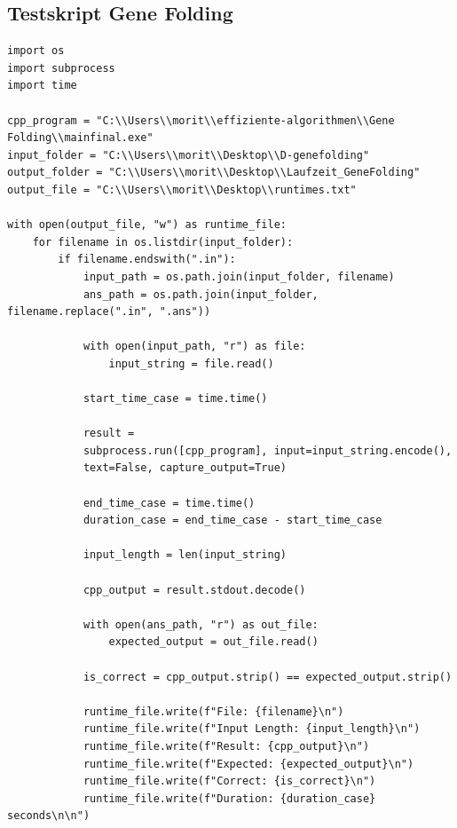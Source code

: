 \subsection{Testskript Gene Folding}
\label{subsec:TextBefehle}
\begin{verbatim}
import os
import subprocess
import time

cpp_program = "C:\\Users\\morit\\effiziente-algorithmen\\Gene Folding\\mainfinal.exe"
input_folder = "C:\\Users\\morit\\Desktop\\D-genefolding"
output_folder = "C:\\Users\\morit\\Desktop\\Laufzeit_GeneFolding"
output_file = "C:\\Users\\morit\\Desktop\\runtimes.txt"

with open(output_file, "w") as runtime_file:
    for filename in os.listdir(input_folder):
        if filename.endswith(".in"):
            input_path = os.path.join(input_folder, filename)
            ans_path = os.path.join(input_folder, filename.replace(".in", ".ans"))

            with open(input_path, "r") as file:
                input_string = file.read()

            start_time_case = time.time()

            result = 
            subprocess.run([cpp_program], input=input_string.encode(), 
            text=False, capture_output=True)

            end_time_case = time.time()
            duration_case = end_time_case - start_time_case

            input_length = len(input_string)

            cpp_output = result.stdout.decode()

            with open(ans_path, "r") as out_file:
                expected_output = out_file.read()

            is_correct = cpp_output.strip() == expected_output.strip()

            runtime_file.write(f"File: {filename}\n")
            runtime_file.write(f"Input Length: {input_length}\n")
            runtime_file.write(f"Result: {cpp_output}\n")
            runtime_file.write(f"Expected: {expected_output}\n")
            runtime_file.write(f"Correct: {is_correct}\n")
            runtime_file.write(f"Duration: {duration_case} seconds\n\n")

\end{verbatim}
%
